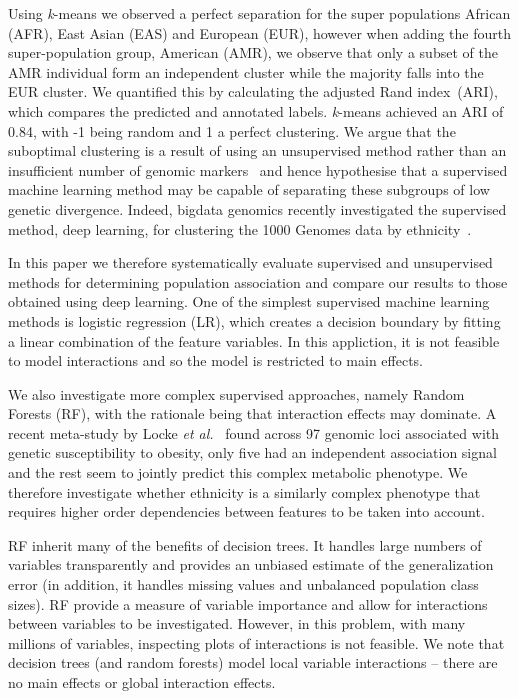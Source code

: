 \documentclass{llncs}
\newcommand{\kMeans}{\textit{k}-means }
\newcommand{\ARI}{adjusted Rand index}
\begin{document}
{Using \kMeans{} we observed a perfect separation for the super populations African (AFR), East Asian (EAS) and European
(EUR), however when adding the fourth super-population group, American (AMR), we observe that only a subset of the AMR
individual form an independent cluster while the majority falls into the EUR cluster.  We quantified this by calculating
the \ARI\ (ARI), which compares the predicted and annotated labels. \kMeans achieved an ARI of 0.84, with -1 being
random and 1 a perfect clustering.  We argue that the suboptimal clustering is a result of using an unsupervised method
rather than an insufficient number of genomic markers~\cite{Patterson2006} and hence hypothesise that a supervised
machine learning method may be capable of separating these subgroups of low genetic divergence.  Indeed, bigdata
genomics recently investigated the supervised method, deep learning, for clustering the 1000 Genomes data by
ethnicity~\cite{Ferguson}.  

In this paper we therefore systematically evaluate supervised and unsupervised methods for determining population
association and compare our results to those obtained using deep learning.
One of the simplest supervised machine learning methods is logistic regression (LR), which creates a decision boundary
by fitting a linear combination of the feature variables.  In this appliction, it is not feasible to model interactions and
so the model is restricted to main effects. 

We also investigate more complex supervised
approaches, namely Random Forests (RF), with the rationale being that interaction effects may dominate. A recent meta-study by
Locke {\it et al.}~\cite{Locke2015} found across 97 genomic loci associated with genetic susceptibility to obesity, only five
had an independent association signal and the rest seem to jointly predict this complex metabolic phenotype.  
We therefore investigate whether ethnicity is a similarly complex phenotype that requires higher order dependencies between
features to be taken into account. %

RF inherit many of the benefits of decision trees. It handles large numbers of variables transparently and
provides an unbiased estimate of the generalization error (in addition, it handles missing values and unbalanced
population class sizes). RF provide a measure of variable importance and allow for interactions between
variables to be investigated. However, in this problem, with many millions of variables, inspecting plots of interactions
is not feasible.  We note that decision trees (and random forests) model local variable interactions -- there are 
no main effects or global interaction effects. 

}
\end{document}
